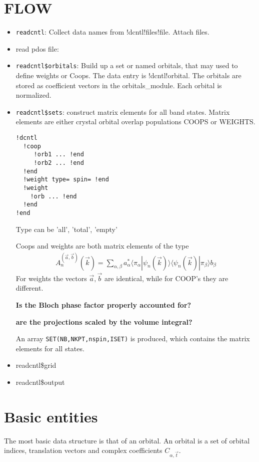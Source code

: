 \documentclass[11pt,a4paper]{report}
\begin{document}
\section{FLOW}
\begin{itemize}
\item \verb|readcntl|: Collect data names from !dcntl!files!file. Attach
  files.
%
\item read pdos file:
%
\item \verb|readcntl$orbitals|: Build up a set or named orbitals, that
  may used to define weights or Coops. The data entry is
  !dcntl!orbital. The orbitals are stored as coefficient vectors in the
  orbitals\_module. Each orbital is normalized.
%
\item \verb|readcntl$sets|: construct matrix elements for all band
  states. Matrix elements are either crystal orbital overlap
  populations COOPS or WEIGHTS.
\begin{verbatim}
!dcntl
  !coop
     !orb1 ... !end
     !orb2 ... !end
  !end
  !weight type= spin= !end
  !weight 
    !orb ... !end
  !end
!end
\end{verbatim}
Type can be 'all', 'total', 'empty'

Coops and weights are both matrix elements of the
  type 
\begin{eqnarray}
A^{(\vec{a},\vec{b})}_{n}(\vec{k})
=\sum_{\alpha,\beta}
a^*_{\alpha}
\langle\pi_\alpha|\psi_n(\vec{k})\rangle
\langle\psi_n(\vec{k})|\pi_\beta\rangle
b_{\beta}
\end{eqnarray}
For weights the vectors $\vec{a},\vec{b}$ are identical, while for
COOP's they are different.

\textbf{Is the Bloch phase factor properly accounted for?}

\textbf{ are the projections scaled by the volume integral?}

An array \verb|SET(NB,NKPT,nspin,ISET)| is produced, which contains
the matrix elements for all states.


\item readcntl\$grid
\item readcntl\$output
\end{itemize}

\section{Basic entities}
The most basic data structure is that of an orbital. An orbital is a
set of orbital indices, translation vectors and complex coefficients
$C_{\alpha,\vec{t}}$.
\end{document}
